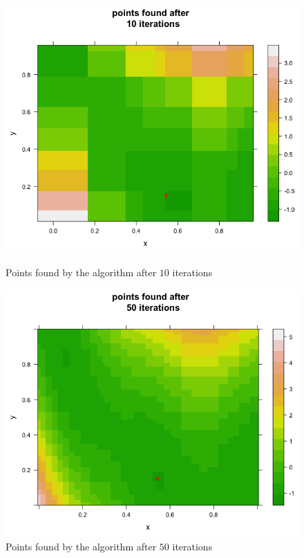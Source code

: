 \begin{figure}[!htb]
    \centering
    \begin{minipage}{.5\textwidth}
        \centering
        \includegraphics[width=1.064\linewidth, height=0.3\textheight]{gfx/chapter-bayesianrvfl/min_branin_10_iter.png}
        \caption{Points found by the algorithm after $10$ iterations}
        \label{min_branin_10_iter}
    \end{minipage}%
    \begin{minipage}{0.5\textwidth}
        \centering
        \includegraphics[width=1.064\linewidth, height=0.3\textheight]{gfx/chapter-bayesianrvfl/min_branin_50_iter.png}
        \caption{Points found by the algorithm after $50$ iterations}
        \label{min_branin_50_iter}
    \end{minipage}
\end{figure}
